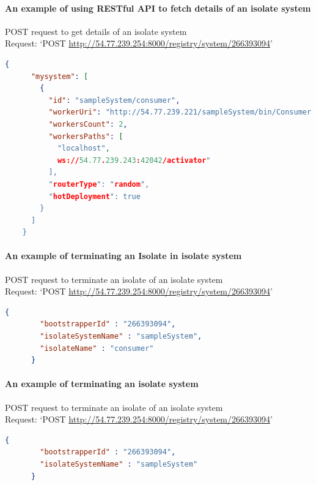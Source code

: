 \paragraph{An example of using RESTful API to fetch details of an isolate system}
  \begin{description}
    \item{POST request to get details of an isolate system}\\
    Request: ‘POST \url{http://54.77.239.254:8000/registry/system/266393094}’
    \begin{lstlisting}[language=json,firstnumber=1]
    {
      "mysystem": [
        {
          "id": "sampleSystem/consumer",
          "workerUri": "http://54.77.239.221/sampleSystem/bin/Consumer.dart",
          "workersCount": 2,
          "workersPaths": [
            "localhost",
            ws://54.77.239.243:42042/activator"
          ],
          "routerType": "random",
          "hotDeployment": true
        }
      ]
    }
  \end{lstlisting}
  \end{description}

\paragraph{An example of terminating an Isolate in isolate system}
  \begin{description}
    \item{POST request to terminate an isolate of an isolate system}\\
    Request: ‘POST \url{http://54.77.239.254:8000/registry/system/266393094}’
    \begin{lstlisting}[language=json,firstnumber=1]
      {
        "bootstrapperId" : "266393094",
        "isolateSystemName" : "sampleSystem",
        "isolateName" : "consumer"
      }
    \end{lstlisting}
  \end{description}

\paragraph{An example of terminating an isolate system}
  \begin{description}
    \item{POST request to terminate an isolate of an isolate system}\\
    Request: ‘POST \url{http://54.77.239.254:8000/registry/system/266393094}’
    \begin{lstlisting}[language=json,firstnumber=1]
      {
        "bootstrapperId" : "266393094",
        "isolateSystemName" : "sampleSystem"
      }
    \end{lstlisting}
  \end{description}

